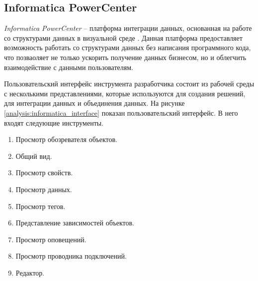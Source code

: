 \newpage

\subsection{Informatica PowerCenter}

\textit{Informatica PowerCenter} -- платформа интеграции данных, основанная на 
работе со структурами данных в визуальной среде \cite{bib3}.  
Данная платформа предоставляет возможность работать со структурами данных 
без написания программного кода, что позваоляет не только ускорить получение данных бизнесом,
но и облегчить взаимодействие с данными пользователям. 

Пользовательский интерфейс инструмента разработчика состоит из рабочей среды с несколькими представлениями,
которые используются для создания решений, для интеграции данных и объединения данных.
На рисунке \ref{analysis:informatica_interface} показан пользовательский интерфейс. 
В него входят следующие инструменты.

\begin{enumerate}
   \item Просмотр обозревателя объектов.
   \item Общий вид.
   \item Просмотр свойств.
   \item Просмотр данных.
   \item Просмотр тегов.
   \item Представление зависимостей объектов.
   \item Просмотр оповещений.
   \item Просмотр проводника подключений.
   \item Редактор.
\end{enumerate}

\begin{figure}[ht!]
\end{figure}

